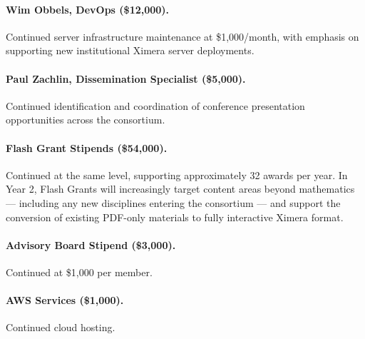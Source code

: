 \documentclass[12pt,letterpaper]{article}
\begin{document}
\paragraph{Wim Obbels, DevOps (\$12,000).} Continued server infrastructure maintenance at \$1,000/month, with emphasis on supporting new institutional Ximera server deployments.

\paragraph{Paul Zachlin, Dissemination Specialist (\$5,000).} Continued identification and coordination of conference presentation opportunities across the consortium.


\paragraph{Flash Grant Stipends (\$54,000).} Continued at the same level, supporting approximately 32 awards per year. In Year 2, Flash Grants will increasingly target content areas beyond mathematics --- including any new disciplines entering the consortium --- and support the conversion of existing PDF-only materials to fully interactive Ximera format.

\paragraph{Advisory Board Stipend (\$3,000).} Continued at \$1,000 per member.

\paragraph{AWS Services (\$1,000).} Continued cloud hosting.
\end{document}
